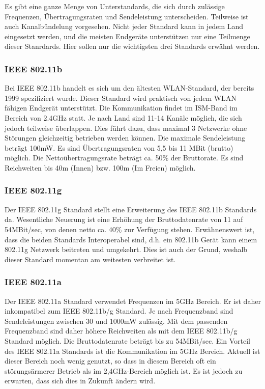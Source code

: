 Es gibt eine ganze Menge von Unterstandards, die sich durch zulässige Frequenzen, 
Übertragungsraten und Sendeleistung unterscheiden. Teilweise ist auch Kanalbündelung 
vorgesehen. Nicht jeder Standard kann in jedem Land eingesetzt werden, und die meisten
Endgeräte unterstützen nur eine Teilmenge dieser Stanrdards. Hier sollen nur die
wichtigsten drei Standards erwähnt werden.

\subsubsection{IEEE 802.11b}
Bei IEEE 802.11b handelt es sich um den ältesten WLAN-Standard, der bereits 1999 
spezifiziert wurde. Dieser Standard wird praktisch von jedem WLAN fähigen 
Endgerät unterstützt. Die Kommunikation findet im ISM-Band im Bereich von 2.4GHz
statt. Je nach Land sind 11-14 Kanäle möglich, die sich jedoch teilweise überlappen.
Dies führt dazu, dass maximal 3 Netzwerke ohne Störungen gleichzeitig betrieben werden
können. Die maximale Sendeleistung beträgt 100mW. Es sind Übertragungsraten von 
5,5 bis 11 MBit (brutto) möglich. Die Nettoübertragungsrate beträgt ca. 50\% der
Bruttorate. Es sind Reichweiten bis 40m (Innen) bzw. 100m (Im Freien) möglich\cite{WirelessNetworking}.

\subsubsection{IEEE 802.11g}
Der IEEE 802.11g Standard stellt eine Erweiterung des IEEE 802.11b Standards da.
Wesentliche Neuerung ist eine Erhöhung der Bruttodatenrate von 11 auf 54MBit/sec,
von denen netto ca. 40\% zur Verfügung stehen. Erwähnenswert ist, dass die
beiden Standards Interoperabel sind, d.h. ein 802.11b Gerät kann einem
802.11g Netzwerk beitreten und umgekehrt. Dies ist auch der Grund, weshalb
dieser Standard momentan am weitesten verbreitet ist.

\subsubsection{IEEE 802.11a}
Der IEEE 802.11a Standard verwendet Frequenzen im 5GHz Bereich. Er ist daher
inkompatibel zum IEEE 802.11b/g Standard. Je nach Frequenzband sind 
Sendeleistungen zwischen 30 und 1000mW zulässig. Mit dem passenden Frequenzband
sind daher höhere Reichweiten als mit dem IEEE 802.11b/g Standard möglich.
Die Bruttodatenrate beträgt bis zu 54MBit/sec. 
Ein Vorteil des IEEE 802.11a Standards ist die Kommunikation im 5GHz Bereich.
Aktuell ist dieser Bereich noch wenig genutzt, so dass in diesem
Bereich oft ein störungsärmerer Betrieb als im 2,4GHz-Bereich möglich ist.
Es ist jedoch zu erwarten, dass sich dies in Zukunft ändern wird.

